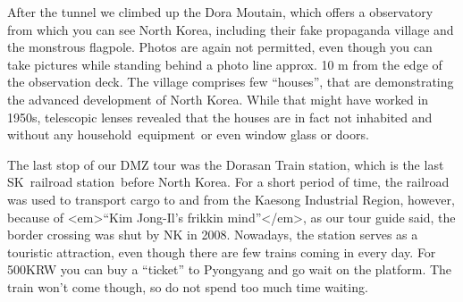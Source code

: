 \begin{post}
\begin{content}
After the tunnel we climbed up the Dora Moutain, which offers a observatory from which you can see North Korea, including their fake propaganda village and the monstrous flagpole. Photos are again not permitted, even though you can take pictures while standing behind a photo line approx. 10 m from the edge of the observation deck. The village comprises few ``houses'', that are demonstrating the advanced development of North Korea. While that might have worked in 1950s, telescopic lenses revealed that the houses are in fact not inhabited and without any household equipment or even window glass or doors.

\begin{figure}[h]
\centering{}
\end{figure}

The last stop of our DMZ tour was the Dorasan Train station, which is the last SK railroad station before North Korea. For a short period of time, the railroad was used to transport cargo to and from the Kaesong Industrial Region, however, because of <em>``Kim Jong-Il's frikkin mind''</em>, as our tour guide said, the border crossing was shut by NK in 2008. Nowadays, the station serves as a touristic attraction, even though there are few trains coming in every day. For 500KRW you can buy a ``ticket'' to Pyongyang and go wait on the platform. The train won't come though, so do not spend too much time waiting.

\begin{figure}[h]
\centering{}
\end{figure}



\end{content}
\end{post}
